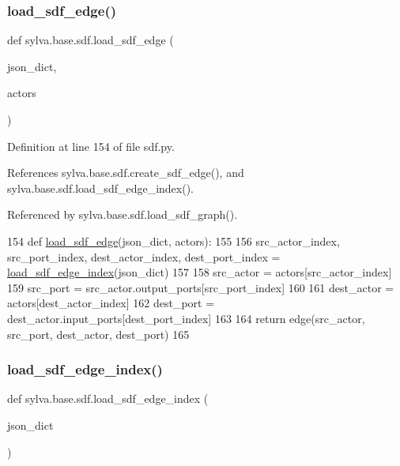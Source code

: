 \subsubsection{\texorpdfstring{load\+\_\+sdf\+\_\+edge()}{load\_sdf\_edge()}}
{\footnotesize\ttfamily def sylva.\+base.\+sdf.\+load\+\_\+sdf\+\_\+edge (\begin{DoxyParamCaption}\item[{}]{json\+\_\+dict,  }\item[{}]{actors }\end{DoxyParamCaption})}



Definition at line 154 of file sdf.\+py.



References sylva.\+base.\+sdf.\+create\+\_\+sdf\+\_\+edge(), and sylva.\+base.\+sdf.\+load\+\_\+sdf\+\_\+edge\+\_\+index().



Referenced by sylva.\+base.\+sdf.\+load\+\_\+sdf\+\_\+graph().


\begin{DoxyCode}
154     \textcolor{keyword}{def }\hyperlink{namespacesylva_1_1base_1_1sdf_acd1ba464e47476a5205de3e3856fbb83}{load\_sdf\_edge}(json\_dict, actors):
155 
156         src\_actor\_index, src\_port\_index, dest\_actor\_index, dest\_port\_index = 
      \hyperlink{namespacesylva_1_1base_1_1sdf_a67886f481ab9be68797400241d754f64}{load\_sdf\_edge\_index}(json\_dict)
157 
158         src\_actor = actors[src\_actor\_index]
159         src\_port = src\_actor.output\_ports[src\_port\_index]
160 
161         dest\_actor = actors[dest\_actor\_index]
162         dest\_port = dest\_actor.input\_ports[dest\_port\_index]
163 
164         \textcolor{keywordflow}{return} edge(src\_actor, src\_port, dest\_actor, dest\_port)
165 
\end{DoxyCode}
\mbox{\label{namespacesylva_1_1base_1_1sdf_a67886f481ab9be68797400241d754f64}} 
\subsubsection{\texorpdfstring{load\+\_\+sdf\+\_\+edge\+\_\+index()}{load\_sdf\_edge\_index()}}
{\footnotesize\ttfamily def sylva.\+base.\+sdf.\+load\+\_\+sdf\+\_\+edge\+\_\+index (\begin{DoxyParamCaption}\item[{}]{json\+\_\+dict }\end{DoxyParamCaption})}



